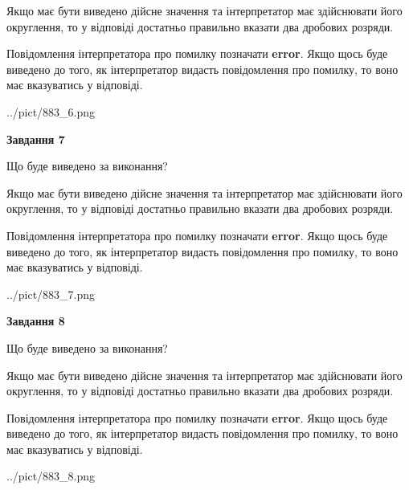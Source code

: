 \documentclass[12pt, ukrainian]{article}
\begin{document}
{\begin {Large}
Якщо має бути виведено дійсне значення та інтерпретатор має здійснювати його округлення, 
то у відповіді достатньо правильно вказати два дробових розряди.

Повідомлення інтерпретатора про помилку позначати \textbf{error}.
Якщо щось буде виведено до того, як інтерпретатор видасть повідомлення про помилку, 
то воно має вказуватись у відповіді. \par

\begin{center}
	{../pict/883_6.png}
\end{center}
\newpage

{\begin {center}\textbf{Завдання 7}\end {center}}\par
Що буде виведено за виконання? \par

Якщо має бути виведено дійсне значення та інтерпретатор має здійснювати його округлення, 
то у відповіді достатньо правильно вказати два дробових розряди.

Повідомлення інтерпретатора про помилку позначати \textbf{error}.
Якщо щось буде виведено до того, як інтерпретатор видасть повідомлення про помилку, 
то воно має вказуватись у відповіді. \par

\begin{center}
	{../pict/883_7.png}
\end{center}
\newpage

{\begin {center}\textbf{Завдання 8}\end {center}}\par
Що буде виведено за виконання? \par

Якщо має бути виведено дійсне значення та інтерпретатор має здійснювати його округлення, 
то у відповіді достатньо правильно вказати два дробових розряди.

Повідомлення інтерпретатора про помилку позначати \textbf{error}.
Якщо щось буде виведено до того, як інтерпретатор видасть повідомлення про помилку, 
то воно має вказуватись у відповіді. \par

\begin{center}
	{../pict/883_8.png}
\end{center}
\newpage


\end{Large}}
\end{document}
